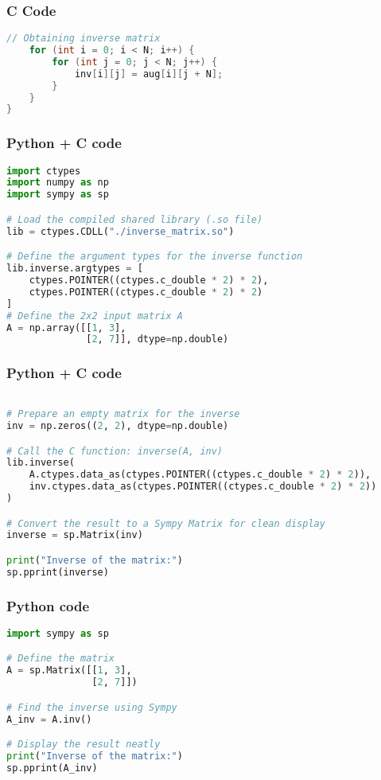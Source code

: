 \documentclass{beamer}
\begin{document}
\begin{frame}[fragile]
    \frametitle{C Code }
    \begin{lstlisting}[language=C]
    // Obtaining inverse matrix
    for (int i = 0; i < N; i++) {
        for (int j = 0; j < N; j++) {
            inv[i][j] = aug[i][j + N];
        }
    }
}

    \end{lstlisting}
\end{frame}
\begin{frame}[fragile]
    \frametitle{Python + C code}

    \begin{lstlisting}[language=Python]
import ctypes
import numpy as np
import sympy as sp

# Load the compiled shared library (.so file)
lib = ctypes.CDLL("./inverse_matrix.so")

# Define the argument types for the inverse function
lib.inverse.argtypes = [
    ctypes.POINTER((ctypes.c_double * 2) * 2),
    ctypes.POINTER((ctypes.c_double * 2) * 2)
]
# Define the 2x2 input matrix A
A = np.array([[1, 3],
              [2, 7]], dtype=np.double)

    \end{lstlisting}
\end{frame}

\begin{frame}[fragile]
    \frametitle{Python + C code}

    \begin{lstlisting}[language=Python]

# Prepare an empty matrix for the inverse
inv = np.zeros((2, 2), dtype=np.double)

# Call the C function: inverse(A, inv)
lib.inverse(
    A.ctypes.data_as(ctypes.POINTER((ctypes.c_double * 2) * 2)),
    inv.ctypes.data_as(ctypes.POINTER((ctypes.c_double * 2) * 2))
)

# Convert the result to a Sympy Matrix for clean display
inverse = sp.Matrix(inv)

print("Inverse of the matrix:")
sp.pprint(inverse)

\end{lstlisting}
\end{frame}
\begin{frame}[fragile]
    \frametitle{Python code}
    \begin{lstlisting}[language=Python]
import sympy as sp

# Define the matrix
A = sp.Matrix([[1, 3],
               [2, 7]])

# Find the inverse using Sympy
A_inv = A.inv()

# Display the result neatly
print("Inverse of the matrix:")
sp.pprint(A_inv)

    \end{lstlisting}
\end{frame}
\end{document}
